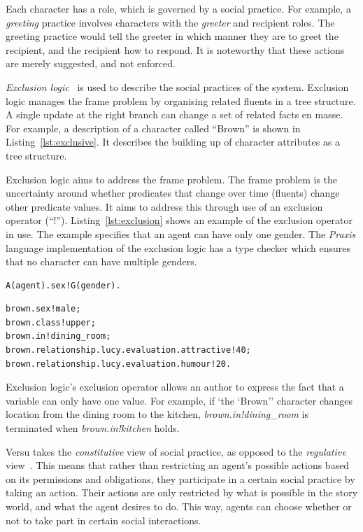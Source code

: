 \documentclass[11pt]{report}
\begin{document}
Each character has a role, which is governed by a social practice. For example, a \emph{greeting} practice involves characters with the \emph{greeter} and recipient roles. The greeting practice would tell the greeter in which manner they are to greet the recipient, and the recipient how to respond. It is noteworthy that these actions are merely suggested, and not enforced.

\emph{Exclusion logic}~\citep{evans2010introducing} is used to describe the
social practices of the system. Exclusion logic manages the frame problem by
organising related fluents in a tree structure. A single update at the right
branch can change a set of related facts en masse. For example, a description of a character called ``Brown'' is shown in Listing~\ref{lst:exclusive}. It describes the building up of character attributes as a tree structure.

Exclusion logic aims to address the frame problem. The frame problem is the uncertainty around whether predicates that change over time (fluents) change other predicate values. It aims to address this through use of an exclusion operator (``!''). Listing~\ref{lst:exclusion} shows an example of the exclusion operator in use. The example specifies that an agent can have only one gender. The \emph{Praxis} language implementation of the exclusion logic has a type checker which ensures that no character can have multiple genders.

\begin{lstlisting}[float,label=lst:exclusion,caption=nextHopInfo: caption]
A(agent).sex!G(gender).
\end{lstlisting}

\begin{lstlisting}[float,label=lst:exclusion,caption=Description of ``Brown'' character.]
brown.sex!male;
brown.class!upper;
brown.in!dining_room;
brown.relationship.lucy.evaluation.attractive!40;
brown.relationship.lucy.evaluation.humour!20.
\end{lstlisting}

Exclusion logic's exclusion operator allows an author to express the fact that a variable can only have one value. For example, if `the `Brown'' character changes location from the dining room to the kitchen, \emph{brown.in!dining\_room} is terminated when \emph{brown.in!kitchen} holds.

Versu takes the \emph{constitutive} view of social practice, as opposed to the
\emph{regulative} view~\citep{SJP:SJP658}. This means that rather than restricting an agent's possible actions based on its permissions and obligations, they participate in a certain social practice by taking an action. Their actions are only restricted by what is possible in the story world, and what the agent desires to do. This way, agents can choose whether or not to take part in certain social interactions.
\end{document}
